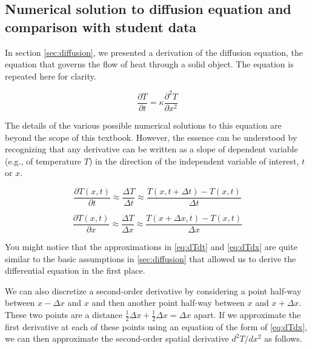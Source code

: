 \newpage

\subsection{Numerical solution to diffusion equation and comparison with student data}

In section \ref{sec:diffusion}, we presented a derivation of the diffusion equation, the equation that governs the flow of heat through a solid object.
The equation is repeated here for clarity.

\begin{equation} \label{eq:diffusion_again} 
\frac{\partial T}{\partial t}=\kappa \frac{\partial ^{2}T}{\partial x^2} 
\end{equation}

The details of the various possible numerical solutions to this equation are beyond the scope of this textbook.
However, the essence can be understood by recognizing that any derivative can be written as a slope of dependent variable (e.g., of temperature $T$) in the direction of the independent variable of interest, $t$ or $x$.

\begin{equation} \label{eq:dTdt} 
\frac{\partial T\left ( x,t \right )}{\partial t}\approx  \frac{\Delta T}{\Delta t}\approx \frac{T\left ( x,t+\Delta t \right )-T\left ( x,t \right )}{\Delta t}
\end{equation}

\begin{equation} \label{eq:dTdx} 
\frac{\partial T\left ( x,t \right )}{\partial x}\approx  \frac{\Delta T}{\Delta x}\approx \frac{T\left ( x+\Delta x,t \right )-T\left ( x,t \right )}{\Delta x}
\end{equation}

You might notice that the approximations in \ref{eq:dTdt} and \ref{eq:dTdx} are quite similar to the basic assumptions in \ref{sec:diffusion} that allowed us to derive the differential equation in the first place.

We can also discretize a second-order derivative by considering a point half-way between $x\!-\!\Delta \!x$ and ${x}$ and then another point half-way between $x$ and  $x\!+\!\Delta \!x$.
These two points are a distance $\frac{1}{2}\Delta x +\frac{1}{2}\Delta x=\Delta x $ apart.
If we approximate the first derivative at each of these points using an equation of the form of \ref{eq:dTdx}, we can then approximate the second-order spatial derivative $d^2T/dx^2$ as follows.

